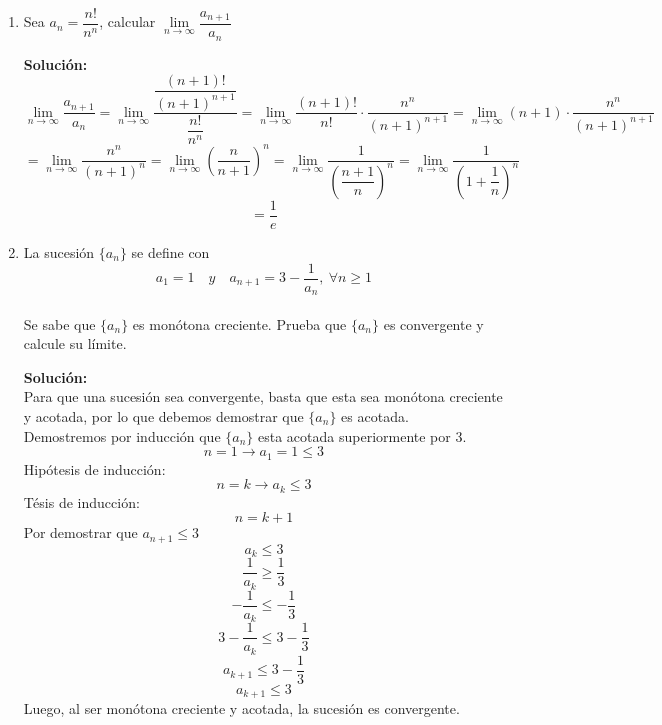 \documentclass[12pt]{article}
\newenvironment{solucion}
{\begin{mdframed}[backgroundcolor=black!10]
		{\bf Solución:}\\
	}
	{
	\end{mdframed}
}
\newenvironment{preguntas}
{\begin{enumerate}\itemsep12pt
	}
	{
	\end{enumerate}
}
\newcommand{\ra}{\rightarrow}
\begin{document}
\begin{preguntas}
\begin{solucion}
\begin{enumerate}[a)]
\item $\left\{1, -\dfrac{2}{3}, \dfrac{4}{9}, -\dfrac{8}{27}, \dots \right\}$\\
			\\
			Observando la sucesión, resulta evidente que el numerador es $2^n$ y el\\ denominador $3^n$. Además, vemos que es alternante, por lo que el término general será
			$$a_n = (-1)^n \dfrac{2^{n}}{3^{n}}$$
			Luego, el límite de la sucesión es igual al límite del termino general, que sería
			$$\lim\limits_{n\ra \infty} a_n = \lim\limits_{n\ra \infty} (-1)^n \dfrac{2^{n}}{3^{n}} = 
			\lim\limits_{n\ra \infty} (-1)^n \left(\dfrac{2}{3}\right)^n = 0$$
\item $\left\{\sqrt[]{2}, \sqrt[]{2\ \sqrt[]{2}}, \sqrt[]{2\ \sqrt[]{2\ \sqrt[]{2}}}, \dots \right\}$
\end{enumerate}
\end{solucion}
\item Sea $a_n = \dfrac{n!}{n^n}$, calcular $\lim\limits_{n \ra \infty} \dfrac{a_{n+1}}{a_n}$
\begin{solucion}
$$\lim\limits_{n \ra \infty} \dfrac{a_{n+1}}{a_n} = \lim\limits_{n \ra \infty} \dfrac{\dfrac{(n+1)!}{(n+1)^{n+1}}}{\dfrac{n!}{n^n}} = \lim\limits_{n \ra \infty} \dfrac{(n+1)!}{n!} \cdot \dfrac{n^n}{(n+1)^{n+1}} =\lim\limits_{n \ra \infty} (n+1) \cdot \dfrac{n^n}{(n+1)^{n+1}}$$
		$$=\lim\limits_{n \ra \infty} \dfrac{n^n}{(n+1)^{n}} = \lim\limits_{n \ra \infty} \left(\dfrac{n}{n+1}\right)^n = \lim\limits_{n \ra \infty} \dfrac{1}{\left(\dfrac{n+1}{n}\right)^n} = \lim\limits_{n \ra \infty} \dfrac{1}{\left(1+\dfrac{1}{n}\right)^n}$$
		$$ = \dfrac{1}{e}$$
\end{solucion}
\item La sucesión $\{a_n\}$ se define con 
		$$a_1=1\quad y\quad a_{n+1} = 3-\dfrac{1}{a_n},\ \forall n\geq 1$$\\
Se sabe que $\{a_n\}$ es monótona creciente. Prueba que $\{a_n\}$ es convergente y calcule su límite.
\begin{solucion}
Para que una sucesión sea convergente, basta que esta sea monótona creciente y acotada, por lo que debemos demostrar que $\{a_n\}$ es acotada.\\

Demostremos por inducción que $\{a_n\}$ esta acotada superiormente por 3. \\
$$n = 1 \ra a_1 = 1 \leq 3$$
Hipótesis de inducción:
$$n = k \ra a_k \leq 3$$
Tésis de inducción:
$$n = k+1$$
Por demostrar que $a_{n+1} \leq 3$
$$a_k \leq 3$$
$$\dfrac{1}{a_k} \geq \dfrac{1}{3}$$
$$-\dfrac{1}{a_k} \leq -\dfrac{1}{3}$$
$$3-\dfrac{1}{a_k} \leq 3-\dfrac{1}{3}$$
$$a_{k+1} \leq 3-\dfrac{1}{3}$$
$$a_{k+1} \leq 3$$
Luego, al ser monótona creciente y acotada, la sucesión es convergente.\\


\end{solucion}
\end{preguntas}
\end{document}
